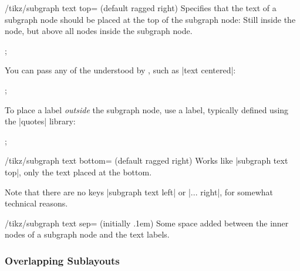 \begin{key}{/tikz/subgraph text top= (default ragged right)}
  Specifies that the text of a subgraph node should be placed at the
  top of the subgraph node: Still inside the node, but above all nodes
  inside the subgraph node.
\begin{codeexample}[] 
  ;
\end{codeexample}  
  You can pass any of the  understood by
  \tikzname, such as |text centered|:
\begin{codeexample}[width=5cm] 
\tikz [subgraph text top=text centered]
  ;
\end{codeexample}   
  To place a label \emph{outside} the subgraph node, use a label,
  typically defined using the |quotes| library:
\begin{codeexample}[] 
\tikz {};
\end{codeexample}  
\end{key}


\begin{key}{/tikz/subgraph text bottom= (default ragged right)}
  Works like |subgraph text top|, only the text placed at the bottom. 
\end{key}

Note that there are no keys |subgraph text left| or |... right|,
for somewhat technical reasons.

\begin{key}{/tikz/subgraph text sep= (initially .1em)}
  Some space added between the inner nodes of a subgraph node and the
  text labels.
\end{key}


\subsubsection{Overlapping Sublayouts}

